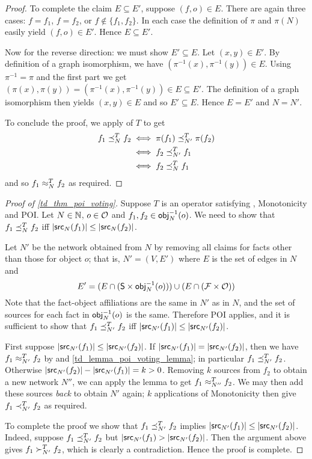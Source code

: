 \begin{proof}
To complete the claim $E \subseteq E'$, suppose $(f, o) \in E$. There are again
three cases: $f = f_1$, $f = f_2$, or $f \notin \{f_1,f_2\}$. In each case the
definition of $\pi$ and $\pi(N)$ easily yield $(f, o) \in E'$. Hence $E
\subseteq E'$.

Now for the reverse direction: we must show $E' \subseteq E$. Let $(x, y) \in
E'$.  By definition of a graph isomorphism, we have $(\pi^{-1}(x), \pi^{-1}(y))
\in E$.  Using $\pi^{-1} = \pi$ and the first part we get $(\pi(x), \pi(y)) =
(\pi^{-1}(x), \pi^{-1}(y)) \in E \subseteq E'$. The definition of a graph
isomorphism then yields $(x, y) \in E$ and so $E' \subseteq E$. Hence $E = E'$
and $N = N'$.

    To conclude the proof, we apply \symmetry{} of $T$ to get
\begin{align*}
    f_1 \preceq_N^T f_2
    & \iff \pi(f_1) \preceq_{N'}^T \pi(f_2) \\
    & \iff f_2 \preceq_{N'}^T f_1 \\
    & \iff f_2 \preceq_N^T f_1
\end{align*}
and so $f_1 \approx_N^T f_2$ as required.
\end{proof}

\begin{proof}[Proof of \cref{td_thm_poi_voting}]

    Suppose $T$ is an operator satisfying \symmetry{}, Monotonicity and POI. Let $N
\in \mathbb{N}$, $o \in \mathcal{O}$ and $f_1, f_2 \in \mathsf{obj}_N^{-1}(o)$. We need to show that
$f_1 \preceq_N^T f_2$ iff $|\mathsf{src}_N(f_1)| \le |\mathsf{src}_N(f_2)|$.

Let $N'$ be the network obtained from $N$ by removing all claims for facts
other than those for object $o$; that is, $N' = (V, E')$ where $E$ is the set
of edges in $N$ and
\[
    E' = (E \cap (\mathsf{S} \times \mathsf{obj}_N^{-1}(o))) \cup (E \cap (\mathcal{F} \times \mathcal{O}))
\]
Note that the fact-object affiliations are the same in $N'$ as in $N$, and the
set of sources for each fact in $\mathsf{obj}_N^{-1}(o)$ is the same. Therefore POI
applies, and it is sufficient to show that
$f_1 \preceq_{N'}^T f_2$ iff $|\mathsf{src}_{N'}(f_1)| \le |\mathsf{src}_{N'}(f_2)|$.

First suppose $|\mathsf{src}_{N'}(f_1)| \le |\mathsf{src}_{N'}(f_2)|$. If $|\mathsf{src}_{N'}(f_1)| =
    |\mathsf{src}_{N'}(f_2)|$, then we have $f_1 \approx_{N'}^T f_2$ by \symmetry{} and
\cref{td_lemma_poi_voting_lemma}; in particular $f_1 \preceq_{N'}^T f_2$. Otherwise
$|\mathsf{src}_{N'}(f_2)| - |\mathsf{src}_{N'}(f_1)| = k > 0$. Removing $k$ sources from $f_2$
to obtain a new network $N''$, we can apply the lemma to get $f_1 \approx_{N''}^T
f_2$. We may then add these sources \emph{back} to obtain $N'$ again; $k$
applications of Monotonicity then give $f_1 \prec_{N'}^T f_2$ as required.

To complete the proof we show that $f_1 \preceq_{N'}^T f_2$ implies
$|\mathsf{src}_{N'}(f_1)| \le |\mathsf{src}_{N'}(f_2)|$. Indeed, suppose $f_1  \preceq_{N'}^T f_2$
but $|\mathsf{src}_{N'}(f_1) > |\mathsf{src}_{N'}(f_2)|$. Then the argument above gives $f_1
\succ_{N'}^T f_2$, which is clearly a contradiction. Hence the proof is
complete.
\end{proof}

